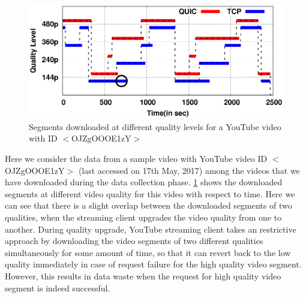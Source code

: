 %		
\begin{figure}[!t]
\centering
\includegraphics[width=0.7\linewidth]{img/plotdata/video/plot_timerange}
\caption{Segments downloaded at different quality levels for a YouTube video with ID $<$OJZgOOOE1zY$>$}
\label{fig:plot_timerange}
\end{figure}

Here we consider the data from a sample video with YouTube video ID $<$OJZgOOOE1zY$>$  (last accessed on 17th May, 2017) among the videos that we have downloaded during the data collection phase. \fig\ref{fig:plot_timerange} shows the downloaded segments at different video quality for this video with respect to time. 
Here we can see that there is a slight overlap between the downloaded segments of two qualities, when the streaming client upgrades the video quality from one to another. During quality upgrade, YouTube streaming client takes an restrictive approach by downloading the video segments of two different qualities simultaneously for some amount of time, so that it can revert back to the low quality immediately in case of request failure for the high quality video segment. %
However, this results in data waste when the request for high quality video segment is indeed successful. 

